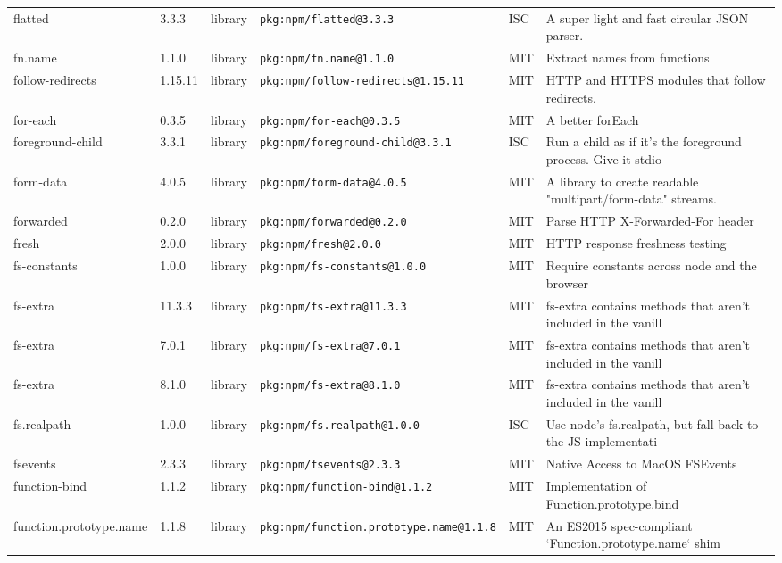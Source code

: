 \documentclass[11pt]{article}
\begin{document}
\begin{longtable}{|l|l|l|p{2.2cm}|l|p{4cm}|}
flatted & 3.3.3 & library & \texttt{pkg:npm/flatted@3.3.3} & ISC & A super light and fast circular JSON parser. \\
fn.name & 1.1.0 & library & \texttt{pkg:npm/fn.name@1.1.0} & MIT & Extract names from functions \\
follow-redirects & 1.15.11 & library & \texttt{pkg:npm/follow-redirects@1.15.11} & MIT & HTTP and HTTPS modules that follow redirects. \\
for-each & 0.3.5 & library & \texttt{pkg:npm/for-each@0.3.5} & MIT & A better forEach \\
foreground-child & 3.3.1 & library & \texttt{pkg:npm/foreground-child@3.3.1} & ISC & Run a child as if it's the foreground process. Give it stdio \\
form-data & 4.0.5 & library & \texttt{pkg:npm/form-data@4.0.5} & MIT & A library to create readable "multipart/form-data" streams.  \\
forwarded & 0.2.0 & library & \texttt{pkg:npm/forwarded@0.2.0} & MIT & Parse HTTP X-Forwarded-For header \\
fresh & 2.0.0 & library & \texttt{pkg:npm/fresh@2.0.0} & MIT & HTTP response freshness testing \\
fs-constants & 1.0.0 & library & \texttt{pkg:npm/fs-constants@1.0.0} & MIT & Require constants across node and the browser \\
fs-extra & 11.3.3 & library & \texttt{pkg:npm/fs-extra@11.3.3} & MIT & fs-extra contains methods that aren't included in the vanill \\
fs-extra & 7.0.1 & library & \texttt{pkg:npm/fs-extra@7.0.1} & MIT & fs-extra contains methods that aren't included in the vanill \\
fs-extra & 8.1.0 & library & \texttt{pkg:npm/fs-extra@8.1.0} & MIT & fs-extra contains methods that aren't included in the vanill \\
fs.realpath & 1.0.0 & library & \texttt{pkg:npm/fs.realpath@1.0.0} & ISC & Use node's fs.realpath, but fall back to the JS implementati \\
fsevents & 2.3.3 & library & \texttt{pkg:npm/fsevents@2.3.3} & MIT & Native Access to MacOS FSEvents \\
function-bind & 1.1.2 & library & \texttt{pkg:npm/function-bind@1.1.2} & MIT & Implementation of Function.prototype.bind \\
function.prototype.name & 1.1.8 & library & \texttt{pkg:npm/function.prototype.name@1.1.8} & MIT & An ES2015 spec-compliant `Function.prototype.name` shim \\

\end{longtable}
\end{document}
